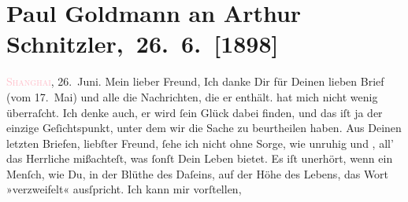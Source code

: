 

               \section[ Paul Goldmann an Arthur Schnitzler, 26. 6. {[}1898{]}]{Paul Goldmann an Arthur Schnitzler, 26. 6. {[}1898{]}}\nopagebreak{}\rehead{ }\normalsize\beginnumbering{} \toendnotes[C]{\smallbreak\pagebreak[2]} 
\toendnotes[C]{\smallbreak}\pstart
           \raggedleft{}{\pb}\textsc{\textcolor{pink}{Shanghai}{}\ledrightnote{\textcolor{pink}{Shanghai}}}, 26. Juni.\pend
           \pstart{}Mein lieber Freund,\pend\pstart
           Ich danke Dir für Deinen lieben Brief (vom 17. Mai)
               und alle die Nachrichten, die er enthält. \label{K_L02848-1v}\label{K_L02848-1h} hat mich nicht wenig überraſcht. Ich
               denke auch, er wird ſein Glück  dabei finden, und das iſt ja der einzige Geſichtspunkt, unter dem wir die
               Sache zu beurtheilen haben.\pend
           \pstart
           Aus Deinen letzten Briefen, liebſter Freund, ſehe ich nicht ohne Sorge, wie {\pb}unruhig und \label{K_L02848-2v}\label{K_L02848-2h}, all’ das Herrliche mißachteſt, was ſonſt Dein
               Leben bietet. Es iſt unerhört, wenn ein Menſch, wie Du, in der Blüthe des Daſeins,
               auf der Höhe des Lebens, das Wort »verzweifelt« ausſpricht. Ich kann mir vorſtellen,
